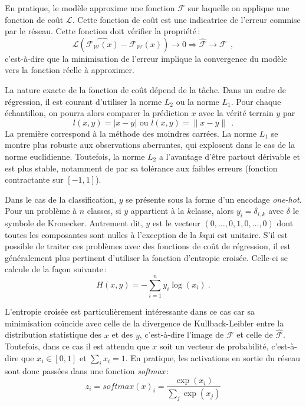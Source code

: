 En pratique, le modèle approxime une fonction $\mathcal{F}$ sur laquelle on applique une fonction de coût $\mathcal{L}$. Cette fonction de coût est une indicatrice de l'erreur commise par le réseau. Cette fonction doit vérifier la propriété\,:
$$\mathcal{L}(\hat{\mathcal{F_W}(x)} - \mathcal{F_W}(x)) \rightarrow 0 \Rightarrow \hat{\mathcal{F}} \rightarrow \mathcal{F}~~,$$
c'est-à-dire que la minimisation de l'erreur implique la convergence du modèle vers la fonction réelle à approximer.

La nature exacte de la fonction de coût dépend de la tâche. Dans un cadre de régression, il est courant d'utiliser la norme $L_2$ ou la norme $L_1$. Pour chaque échantillon, on pourra alors comparer la prédiction $x$ avec la vérité terrain $y$ par
$$l(x,y) = |x - y| \text{ ou } l(x,y) = \lVert x - y \rVert~~.$$
La première correspond à la méthode des moindres carrées. La norme $L_1$ se montre plus robuste aux observations aberrantes, qui explosent dans le cas de la norme euclidienne. Toutefois, la norme $L_2$ a l'avantage d'être partout dérivable et est plus stable, notamment de par sa tolérance aux faibles erreurs (fonction contractante sur $[-1, 1]$).

Dans le cas de la classification, $y$ se présente sous la forme d'un encodage \emph{one-hot}. Pour un problème à $n$ classes, si $y$ appartient à la $k$\ieme classe, alors $y_i = \delta_{i,k}$ avec $\delta$ le symbole de Kronecker. Autrement dit, $y$ est le vecteur $(0, \dots, 0, 1, 0, \dots, 0)$ dont toutes les composantes sont nulles à l'exception de la $k$\ieme qui est unitaire. S'il est possible de traiter ces problèmes avec des fonctions de coût de régression, il est généralement plus pertinent d'utiliser la fonction d'entropie croisée. Celle-ci se calcule de la façon suivante\,:
$$H(x,y) = -\sum_{i=1}^n y_i \log(x_i)~.$$

L'entropie croisée est particulièrement intéressante dans ce cas car sa minimisation coïncide avec celle de la divergence de Kullback-Leibler entre la distribution statistique des $x$ et des $y$, c'est-à-dire l'image de $\mathcal{F}$ et celle de $\hat{\mathcal{F}}$. Toutefois, dans ce cas il est attendu que $x$ soit un vecteur de probabilité, c'est-à-dire que $x_i \in [0,1]$ et $\sum_i x_i = 1$. En pratique, les activations en sortie du réseau sont donc passées dans une fonction \emph{softmax}\,:
\begin{equation}
z_i = \mathit{softmax}(x)_i = \frac{\exp(x_i)}{\sum_j \exp(x_j)}
\end{equation}

